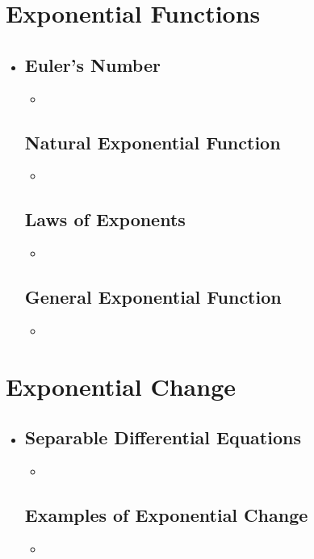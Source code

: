 \section{Exponential Functions}
\begin{itemize}
  \item []
  
  \subsection{Euler's Number}
  \begin{itemize}
    \item 
  \end{itemize}

  \subsection{Natural Exponential Function}
  \begin{itemize}
    \item 
  \end{itemize}

  \subsection{Laws of Exponents}
  \begin{itemize}
    \item 
  \end{itemize}

  \subsection{General Exponential Function}
  \begin{itemize}
    \item 
  \end{itemize}
  
\end{itemize}

\section{Exponential Change}
  \begin{itemize}
    \item 

  \subsection{Separable Differential Equations}
  \begin{itemize}
    \item 
  \end{itemize}

  \subsection{Examples of Exponential Change}
  \begin{itemize}
    \item 
  \end{itemize}
  
\end{itemize}
  

